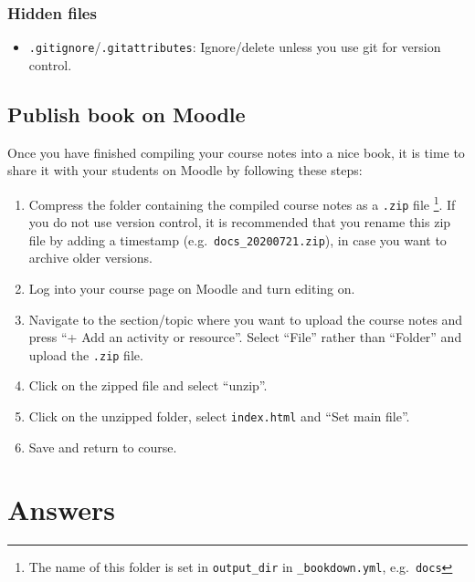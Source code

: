 \documentclass[
]{book}
\providecommand{\tightlist}{%
  \setlength{\itemsep}{0pt}\setlength{\parskip}{0pt}}
\theoremstyle{definition}
\theoremstyle{definition}
\theoremstyle{definition}
\theoremstyle{remark}
\begin{document}
\hypertarget{hidden-files}{%
\subsection*{Hidden files}\label{hidden-files}}

\begin{itemize}
\tightlist
\item
  \texttt{.gitignore}/\texttt{.gitattributes}: Ignore/delete unless you use git for version control.
\end{itemize}

\hypertarget{publish-book-on-moodle}{%
\section{Publish book on Moodle}\label{publish-book-on-moodle}}

Once you have finished compiling your course notes into a nice book, it is time to share it with your students on Moodle by following these steps:

\begin{enumerate}
\def\labelenumi{\arabic{enumi}.}
\item
  Compress the folder containing the compiled course notes as a \texttt{.zip} file
  \footnote{The name of this folder is set in \texttt{output\_dir} in \texttt{\_bookdown.yml}, e.g.~\texttt{docs}}.
  If you do not use version control, it is recommended that you rename this zip file by adding a timestamp (e.g.~\texttt{docs\_20200721.zip}), in case you want to archive older versions.
\item
  Log into your course page on Moodle and turn editing on.
\item
  Navigate to the section/topic where you want to upload the course notes and press ``+ Add an activity or resource''.
  Select ``File'' rather than ``Folder'' and upload the \texttt{.zip} file.
\item
  Click on the zipped file and select ``unzip''.
\item
  Click on the unzipped folder, select \texttt{index.html} and ``Set main file''.
\item
  Save and return to course.
\end{enumerate}

\hypertarget{appendix-appendix}{%
\appendix}


\hypertarget{answers}{%
\chapter{Answers}\label{answers}}
\end{document}
